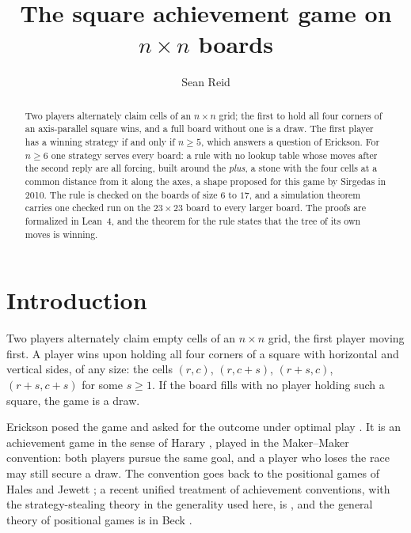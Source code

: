 \documentclass[11pt]{amsart}
\title{The square achievement game on \texorpdfstring{$n \times n$}{n x n} boards}
\author{Sean Reid}
\theoremstyle{definition}
\theoremstyle{remark}
\begin{document}
\begin{abstract}
Two players alternately claim cells of an $n \times n$ grid; the first
to hold all four corners of an axis-parallel square wins, and a full
board without one is a draw. The first player has a winning strategy
if and only if $n \ge 5$, which answers a question of Erickson. For
$n \ge 6$ one strategy serves every board: a rule with no lookup table
whose moves after the second reply are all forcing, built around the
\emph{plus}, a stone with the four cells at a common distance from it
along the axes, a shape proposed for this game by Sirgedas in 2010. The
rule is checked on the boards of size $6$ to $17$, and a simulation
theorem carries one checked run on the $23 \times 23$ board to every
larger board. The proofs are formalized in Lean~4, and the theorem for
the rule states that the tree of its own moves is winning.
\end{abstract}

\maketitle

\section{Introduction}

Two players alternately claim empty cells of an $n \times n$ grid, the
first player moving first. A player wins upon holding all four corners
of a square with horizontal and vertical sides, of any size: the cells
$(r,c)$, $(r,c+s)$, $(r+s,c)$, $(r+s,c+s)$ for some $s \ge 1$. If the
board fills with no player holding such a square, the game is a draw.

Erickson posed the game and asked for the outcome under optimal play
\cite{erickson-pearls, opg, erickson-mo}. It is an achievement game in the sense of
Harary \cite{harary}, played in the Maker--Maker convention: both
players pursue the same goal, and a player who loses the race may still
secure a draw. The convention goes back to the positional games of
Hales and Jewett \cite{hales-jewett}; a recent unified treatment of
achievement conventions, with the strategy-stealing theory in the
generality used here, is \cite{galliot-senizergues}, and the general
theory of positional games is in Beck \cite{beck}.
\end{document}
